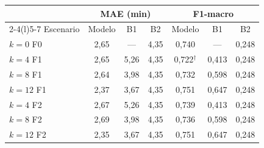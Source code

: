 \begin{tabular}{@{}lcccccc@{}}
\toprule
 & \multicolumn{3}{c}{MAE (min)} & \multicolumn{3}{c}{F1-macro} \\
\cmidrule(lr){2-4}\cmidrule(l){5-7}
Escenario & Modelo & B1 & B2 & Modelo & B1 & B2 \\
\midrule
$k=0$ F0 & 2,65 & — & 4,35 & 0,740 & — & 0,248 \\
$k=4$ F1 & 2,65 & 5,26 & 4,35 & 0,722$^\dagger$ & 0,413 & 0,248 \\
$k=8$ F1 & 2,64 & 3,98 & 4,35 & 0,732 & 0,598 & 0,248 \\
$k=12$ F1 & 2,37 & 3,67 & 4,35 & 0,751 & 0,647 & 0,248 \\
$k=4$ F2 & 2,67 & 5,26 & 4,35 & 0,739 & 0,413 & 0,248 \\
$k=8$ F2 & 2,69 & 3,98 & 4,35 & 0,736 & 0,598 & 0,248 \\
$k=12$ F2 & 2,35 & 3,67 & 4,35 & 0,751 & 0,647 & 0,248 \\
\bottomrule
\end{tabular}
